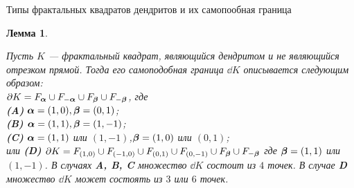 \documentclass[aspectratio=1610, 10pt, notheorems]{beamer}
\newtheorem{lemma}       {Лемма}
\begin{document}
\begin{frame}{Типы фрактальных квадратов дендритов и их самопообная граница}
\large
\begin{lemma}\label{ssboundary}



Пусть $K$ --- фрактальный квадрат, являющийся дендритом и не являющийся отрезком прямой. 
Тогда его самоподобная граница $\dd K$ описывается следующим образом:\\
$\partial K=F_{\bm{\alpha}}\cup F_{-{\bm{\alpha}}}\cup F_{\bm{\beta}}\cup F_{-{\bm{\beta}}}$, где\\
{\bf (A)} ${\bm{\alpha}}=(1,0), {\bm{\beta}}=(0,1)$;\\
{\bf (B)} ${\bm{\alpha}}=(1,1), {\bm{\beta}}=(1,-1)$;\\
{\bf (C)} ${\bm{\alpha}}=(1,1)$ или $(1,-1)$,\qquad\;${\bm{\beta}}=(1,0)$ или $(0,1)$;\\
или {\bf (D)} $\partial K=F_{(1,0)}\cup F_{(-1,0)}\cup F_{(0,1)}\cup F_{(0,-1)}\cup F_{\bm{\beta}}\cup F_{-{\bm{\beta}}}$ где ${\bm{\beta}}=(1,1)$ или $(1,-1)$. 
В случаях {\bf A, B, C} множество $\dd K$ состоит из $4$ точек.
В случае {\bf D} множество $\dd K$ может состоять из $3$ или $6$ точек.
\end{lemma}
\end{frame}


\begin{frame}{
}
\begin{center}
\end{center}
\end{frame}
\end{document}

